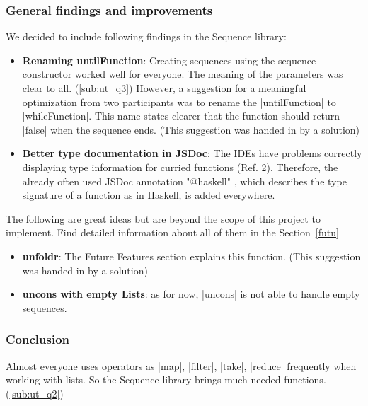 \subsubsection{General findings and improvements} %
\label{subsub:Numerical Differentiation Sequence library}
We decided to include following findings in the Sequence library:
\begin{itemize}
  \item \textbf{Renaming untilFunction}: Creating sequences using the sequence
    constructor worked well for everyone. The meaning of the parameters was
    clear to all. (\ref{sub:ut_q3}) However, a suggestion for a meaningful
    optimization from two participants was to rename the |untilFunction| to
    |whileFunction|. This name states clearer that the function should return
    |false| when the sequence ends. (This suggestion was handed in by a
    solution)
  \item \textbf{Better type documentation in JSDoc}: The IDEs have problems
    correctly displaying type information for curried functions (Ref. 2).
    Therefore, the already often used JSDoc annotation "@haskell" , which
    describes the type signature of a function as in Haskell, is added
    everywhere.
\end{itemize}
The following are great ideas but are beyond the scope of this project to
implement. Find detailed information about all of them in the Section~\ref{futu}
\begin{itemize}
  \item \textbf{unfoldr}: The Future Features section explains this
    function. (This suggestion was handed in by a solution)
  \item \textbf{uncons with empty Lists}: as for now, |uncons| is not able to
    handle empty sequences.
\end{itemize}
\subsubsection{Conclusion} %
\label{subsub:Conclusion}

Almost everyone uses operators as |map|, |filter|, |take|, |reduce|
frequently when working with lists. So the Sequence library brings much-needed
functions. (\ref{sub:ut_q2}) \\ 

